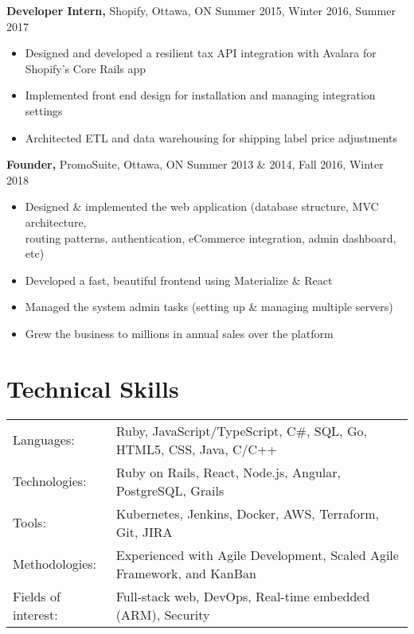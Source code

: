 \documentclass[line, centered]{res}
\begin{document}
\begin{resume}
 {\bf Developer Intern,} Shopify, Ottawa, ON \hfill Summer 2015, Winter 2016, Summer 2017\\[-8pt]
 \begin{itemize} \itemsep -1pt  %
    \item Designed and developed a resilient tax API integration with Avalara for Shopify's Core Rails app
    \item Implemented front end design for installation and managing integration settings
    \item Architected ETL and data warehousing for shipping label price adjustments
 \end{itemize}

 {\bf Founder,} PromoSuite, Ottawa, ON \hfill Summer 2013 \& 2014, Fall 2016, Winter 2018\\[-8pt]
 \begin{itemize} \itemsep -1pt  %
    \item Designed \& implemented the web application (database structure, MVC architecture,\\
            routing patterns, authentication, eCommerce integration, admin dashboard, etc)
    \item Developed a fast, beautiful frontend using Materialize \& React
    \item Managed the system admin tasks (setting up \& managing multiple servers)
    \item Grew the business to millions in annual sales over the platform
 \end{itemize}

\section{Technical Skills}
   \begin{tabular}{l l}
    Languages: & Ruby, JavaScript/TypeScript, C\#, SQL, Go, HTML5, CSS, Java, C/C++
    \\
    Technologies: & Ruby on Rails, React, Node.js, Angular, PostgreSQL, Grails
    \\
    Tools: & Kubernetes, Jenkins, Docker, AWS, Terraform, Git, JIRA
    \\
    Methodologies: & Experienced with Agile Development, Scaled Agile Framework, and KanBan
    \\
    Fields of interest: & Full-stack web, DevOps, Real-time embedded (ARM), Security
 \end{tabular}



\end{resume}
\end{document}
